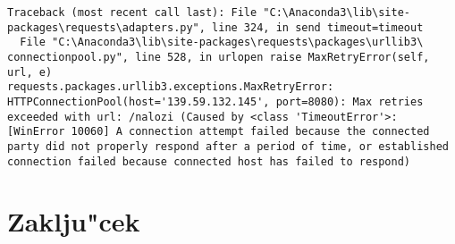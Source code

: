 \begin{itemize}
	\begin{lstlisting}
Traceback (most recent call last): File "C:\Anaconda3\lib\site-packages\requests\adapters.py", line 324, in send timeout=timeout
  File "C:\Anaconda3\lib\site-packages\requests\packages\urllib3\ connectionpool.py", line 528, in urlopen raise MaxRetryError(self, url, e)
requests.packages.urllib3.exceptions.MaxRetryError: HTTPConnectionPool(host='139.59.132.145', port=8080): Max retries exceeded with url: /nalozi (Caused by <class 'TimeoutError'>: [WinError 10060] A connection attempt failed because the connected party did not properly respond after a period of time, or established connection failed because connected host has failed to respond)
	\end{lstlisting}

    \end{itemize}


\section{Zaklju"cek}

